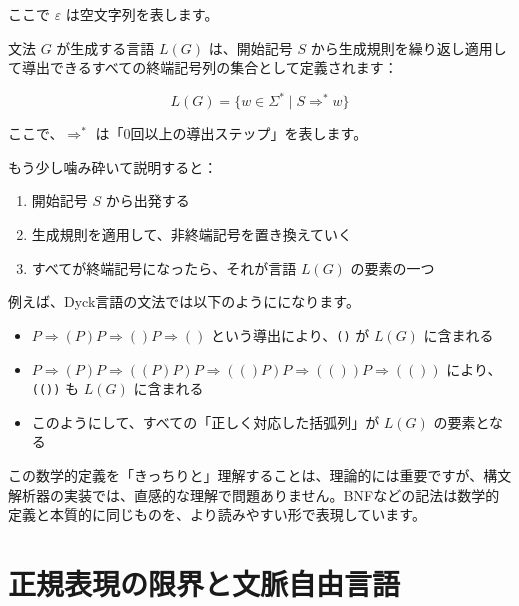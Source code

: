 ここで \(\varepsilon\) は空文字列を表します。

文法 \(G\) が生成する言語 \(L(G)\) は、開始記号 \(S\)
から生成規則を繰り返し適用して導出できるすべての終端記号列の集合として定義されます：

\[L(G) = \{w \in \Sigma^* \mid S \Rightarrow^* w\}\]

ここで、\(\Rightarrow^*\) は「0回以上の導出ステップ」を表します。

もう少し噛み砕いて説明すると：

\begin{enumerate}
\def\labelenumi{\arabic{enumi}.}
\tightlist
\item
  開始記号 \(S\) から出発する
\item
  生成規則を適用して、非終端記号を置き換えていく
\item
  すべてが終端記号になったら、それが言語 \(L(G)\) の要素の一つ
\end{enumerate}

例えば、Dyck言語の文法では以下のようにになります。

\begin{itemize}
\tightlist
\item
  \(P \Rightarrow (P)P \Rightarrow ()P \Rightarrow ()\)
  という導出により、\texttt{()} が \(L(G)\) に含まれる
\item
  \(P \Rightarrow (P)P \Rightarrow ((P)P)P \Rightarrow (()P)P \Rightarrow (())P \Rightarrow (())\)
  により、\texttt{(())} も \(L(G)\) に含まれる
\item
  このようにして、すべての「正しく対応した括弧列」が \(L(G)\)
  の要素となる
\end{itemize}

この数学的定義を「きっちりと」理解することは、理論的には重要ですが、構文解析器の実装では、直感的な理解で問題ありません。BNFなどの記法は数学的定義と本質的に同じものを、より読みやすい形で表現しています。

\hypertarget{chapter4-ux6b63ux898fux8868ux73feux306eux9650ux754cux3068ux6587ux8108ux81eaux7531ux8a00ux8a9e}{%
\section{正規表現の限界と文脈自由言語}\label{chapter4-ux6b63ux898fux8868ux73feux306eux9650ux754cux3068ux6587ux8108ux81eaux7531ux8a00ux8a9e}}

